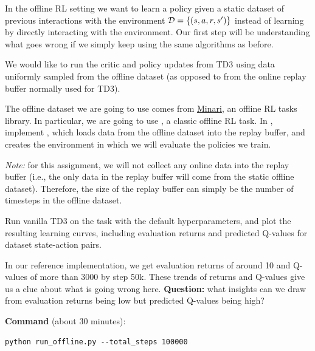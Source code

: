 \documentclass[11pt]{article}
\begin{document}
In the offline RL setting we want to learn a policy given a static dataset of previous interactions with the environment $\mathcal{D} = \{(s, a, r, s')\}$ instead of learning by directly interacting with the environment. Our first step will be understanding what goes wrong if we simply keep using the same algorithms as before.

We would like to run the critic and policy updates from TD3 using data uniformly sampled from the offline dataset (as opposed to from the online replay buffer normally used for TD3).

The offline dataset we are going to use comes from \href{https://minari.farama.org/}{Minari}, an offline RL tasks library. In particular, we are going to use \href{https://minari.farama.org/datasets/mujoco/hopper/medium-v0/}{}, a classic offline RL task. In , implement , which loads data from the offline dataset into the replay buffer, and creates the environment in which we will evaluate the policies we train.

\textit{Note:} for this assignment, we will not collect any online data into the replay buffer (i.e., the only data in the replay buffer will come from the static offline dataset). Therefore, the size of the replay buffer can simply be the number of timesteps in the offline dataset.

Run vanilla TD3 on the  task with the default hyperparameters, and plot the resulting learning curves, including evaluation returns and predicted Q-values for dataset state-action pairs.

In our reference implementation, we get evaluation returns of around 10 and Q-values of more than 3000 by step 50k. These trends of returns and Q-values give us a clue about what is going wrong here. \textbf{Question:} what insights can we draw from evaluation returns being low but predicted Q-values being high?

\textbf{Command} (about 30 minutes):
\begin{verbatim}
python run_offline.py --total_steps 100000
\end{verbatim}
\end{document}
